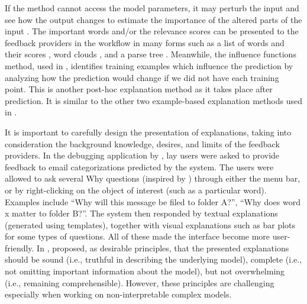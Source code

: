 If the method cannot access the model parameters, it may perturb the input and see how the output changes to estimate the importance of the altered parts of the input .
The important words and/or the relevance scores can be presented to the feedback providers in the \EBHD workflow in many forms such as a list of words and their scores , word clouds , and a parse tree . 
Meanwhile, the influence functions method, used in , identifies training examples which influence the prediction by analyzing how the prediction would change if we did not have each training point. This is another post-hoc explanation method as it takes place after prediction. 
It is similar to the other two example-based explanation methods used in .

It is important to carefully design the presentation of explanations, taking into consideration the background knowledge, desires, and limits of the feedback providers.
In the debugging application by , lay users were asked to provide feedback to email categorizations predicted by the system. 
The users were allowed to ask several Why questions (inspired by ) through either the menu bar, or by right-clicking on the object of interest (such as a particular word).
Examples include ``Why will this message be filed to folder A?'', ``Why does word x matter to  folder B?''.
The system then responded by textual explanations (generated using templates), together with visual explanations such as bar plots for some types of questions.
All of these made the interface become more user-friendly.
In \citeyear{kulesza2015principles}, \citeauthor{kulesza2015principles} proposed, as desirable principles, that the presented explanations should be sound (i.e., truthful in describing the underlying model), complete (i.e., not omitting important information about the model), but not overwhelming (i.e., remaining comprehensible).
However, these principles are challenging especially when working on non-interpretable complex models.

